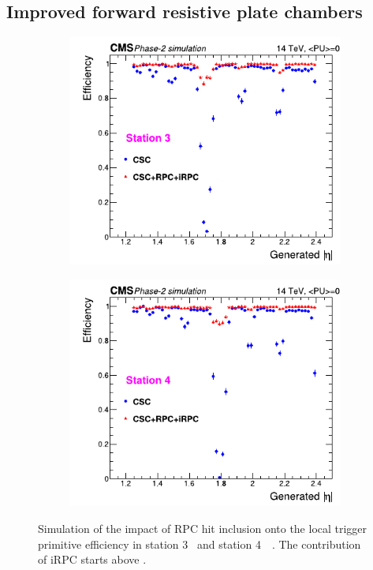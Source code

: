 	\subsection{Improved forward resistive plate chambers}
	\label{chapt4:ssec:iRPCs}

	\begin{figure}[H]
		\begin{subfigure}{0.5\linewidth}
			\centering
			\includegraphics[width=\linewidth]{fig/chapt4/Trigger-efficiency-endcap-3.pdf}
			\caption{\label{fig:Endcap-trigger-eff:A}}
		\end{subfigure}
		\begin{subfigure}{0.5\linewidth}
			\centering
			\includegraphics[width=\linewidth]{fig/chapt4/Trigger-efficiency-endcap-4.pdf}
			\caption{\label{fig:Endcap-trigger-eff:B}}
		\end{subfigure}
		\caption{\label{fig:Endcap-trigger-eff} Simulation of the impact of RPC hit inclusion onto the local trigger primitive efficiency in station 3~ and station 4~~\cite{PHASEIITP}. The contribution of iRPC starts above .}
	\end{figure}
	

